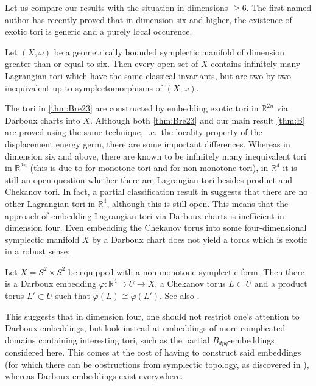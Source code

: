 \documentclass[12pt,a4paper,abstract=true,draft]{scrartcl}
\begin{document}
Let us compare our results with the situation in dimensions $\geqslant 6$.
The first-named author has recently proved that in dimension six and higher, the existence of exotic tori is generic and a purely local occurence. 
\begin{theorem}\cite[Theorem D]{brendel2023local}
    \label{thm:Bre23}
    Let $(X,\omega)$ be a geometrically bounded symplectic manifold of dimension greater than or equal to six.
    Then every open set of $X$ contains infinitely many Lagrangian tori which have the same classical invariants, but are two-by-two inequivalent up to symplectomorphisms of $(X,\omega)$.
\end{theorem}

The tori in \cref{thm:Bre23} are constructed by embedding exotic tori in $\mathbb{R}^{2n}$ via Darboux charts into $X$.
Although both \cref{thm:Bre23} and our main result \cref{thm:B} are proved using the same technique, i.e.\ the locality property of the displacement energy germ, there are some important differences.
Whereas in dimension six and above, there are known to be infinitely many inequivalent tori in $\mathbb{R}^{2n}$ (this is due to \cite{Aur15} for monotone tori and \cite{brendel2023local} for non-monotone tori), in $\mathbb{R}^4$ it is still an open question whether there are Lagrangian tori besides product and Chekanov tori.
In fact, a partial classification result in \cite{Riz19} suggests that there are no other Lagrangian tori in $\mathbb{R}^4$, although this is still open.
This means that the approach of embedding Lagrangian tori via Darboux charts is inefficient in dimension four.
Even embedding the Chekanov torus into some four-dimensional symplectic manifold $X$ by a Darboux chart does not yield a torus which is exotic in a robust sense:
 
\begin{remark}
    Let $X = S^2 \times S^2$ be equipped with a non-monotone symplectic form.
Then there is a Darboux embedding $\varphi \colon \mathbb{R}^4 \supset U \rightarrow X$, a Chekanov torus $L \subset U$ and a product torus $L' \subset U$ such that $\varphi(L) \cong \varphi(L')$.
See also \cite[Example 5.6]{brendel2023local}. 
\end{remark}

This suggests that in dimension four, one should not restrict one's attention to Darboux embeddings, but look instead at embeddings of more complicated domains containing interesting tori, such as the partial $B_{dpq}$-embeddings considered here.
This comes at the cost of having to construct said embeddings (for which there can be obstructions from symplectic topology, as discovered in \cite{EvaSmi18}), whereas Darboux embeddings exist everywhere. 
\end{document}
